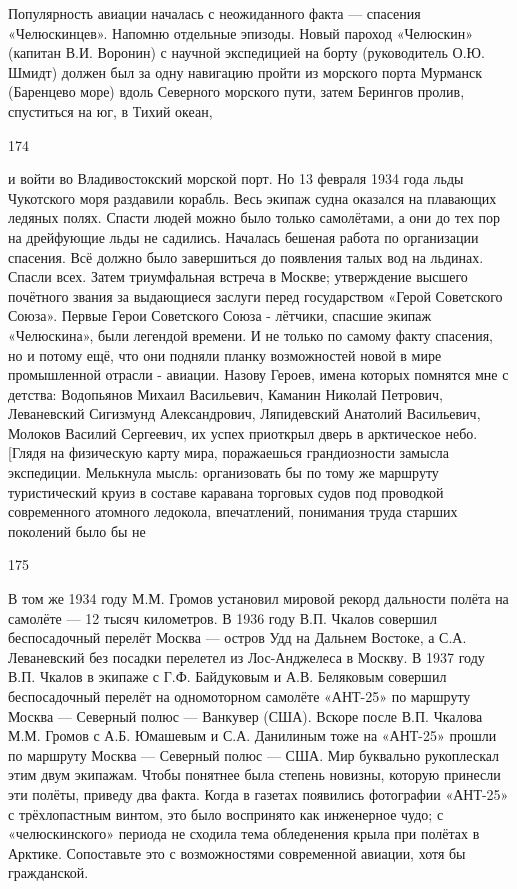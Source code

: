 Популярность авиации началась с неожиданного факта — спасения «Челюскинцев». Напомню отдельные эпизоды. Новый пароход «Челюскин» (капитан В.И. Воронин) с научной экспедицией на борту (руководитель О.Ю. Шмидт) должен был за одну навигацию пройти из морского порта Мурманск (Баренцево море) вдоль Северного морского пути, затем Берингов пролив, спуститься на юг, в Тихий океан,

174

и войти во Владивостокский морской порт. Но 13 февраля 1934 года льды Чукотского моря раздавили корабль. Весь экипаж судна оказался на плавающих ледяных полях. Спасти людей можно было только самолётами, а они до тех пор на дрейфующие льды не садились. Началась бешеная работа по организации спасения. Всё должно было завершиться до появления талых вод на льдинах. Спасли всех. Затем триумфальная встреча в Москве; утверждение высшего почётного звания за выдающиеся заслуги перед государством «Герой Советского Союза». Первые Герои Советского Союза - лётчики, спасшие экипаж «Челюскина», были легендой времени. И не только по самому факту спасения, но и потому ещё, что они подняли планку возможностей новой в мире промышленной отрасли - авиации. Назову Героев, имена которых помнятся мне с детства: Водопьянов Михаил Васильевич, Каманин Николай Петрович, Леваневский Сигизмунд Александрович, Ляпидевский Анатолий Васильевич, Молоков Василий Сергеевич, их успех приоткрыл дверь в арктическое небо. [Глядя на физическую карту мира, поражаешься грандиозности замысла экспедиции. Мелькнула мысль: организовать бы по тому же маршруту туристический круиз в составе каравана торговых судов под проводкой современного атомного ледокола, впечатлений, понимания труда старших поколений было бы не

175

В том же 1934 году М.М. Громов установил мировой рекорд дальности полёта на самолёте — 12 тысяч километров. В 1936 году В.П. Чкалов совершил беспосадочный перелёт Москва — остров Удд на Дальнем Востоке, а С.А. Леваневский без посадки перелетел из Лос-Анджелеса в Москву. В 1937 году В.П. Чкалов в экипаже с Г.Ф. Байдуковым и А.В. Беляковым совершил беспосадочный перелёт на одномоторном самолёте «АНТ-25» по маршруту Москва — Северный полюс — Ванкувер (США). Вскоре после В.П. Чкалова М.М. Громов с А.Б. Юмашевым и С.А. Данилиным тоже на «АНТ-25» прошли по маршруту Москва — Северный полюс — США. Мир буквально рукоплескал этим двум экипажам. Чтобы понятнее была степень новизны, которую принесли эти полёты, приведу два факта. Когда в газетах появились фотографии «АНТ-25» с трёхлопастным винтом, это было воспринято как инженерное чудо; с «челюскинского» периода не сходила тема обледенения крыла при полётах в Арктике. Сопоставьте это с возможностями современной авиации, хотя бы гражданской.

